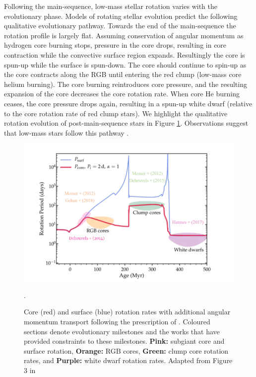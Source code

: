 Following the main-sequence, low-mass stellar rotation varies with the evolutionary phase.
Models of rotating stellar evolution \citep[see, e.g.,][]{maeder_evolution_2000,heger_presupernova_2000} predict the following qualitative evolutionary pathway.
Towards the end of the main-sequence the rotation profile is largely flat.
Assuming conservation of angular momentum as hydrogen core burning stops, pressure in the core drops, resulting in core contraction while the convective surface region expands.
Resultingly the core is spun-up while the surface is spun-down.
The core should continue to spin-up as the core contracts along the RGB until entering the red clump (low-mass core helium burning).
The core burning reintroduces core pressure, and the resulting expansion of the core decreases the core rotation rate.
When core He burning ceases, the core pressure drops again, resulting in a spun-up white dwarf (relative to the core rotation rate of red clump stars).
We highlight the qualitative rotation evolution of post-main-sequence stars in Figure \ref{fig:poms_evo}.
Observations suggest that low-mass stars follow this pathway \citep{mosser_spin_2012,deheuvels_seismic_2014,deheuvels_seismic_2015,hermes_white_2017,gehan_core_2018,deheuvels_seismic_2020}.

\begin{figure}[h]
    \includegraphics[width=\textwidth]{Figures/intro_figures/qualitative_evo.png}
    \caption[Qualitative core and surface rotation rates of post-main-sequence stars.]{Core (red) and surface (blue) rotation rates with additional angular momentum transport following the prescription of \citet{spada_angular_2016}. Coloured sections denote evolutionary milestones and the works that have provided constraints to these milestones. \textbf{Pink:} subgiant core and surface rotation, \textbf{Orange:} RGB cores, \textbf{Green:} clump core rotation rates, and \textbf{Purple:} white dwarf rotation rates. Adapted from Figure 3 in \citet{fuller_slowing_2019}}.
    \label{fig:poms_evo}
\end{figure}


